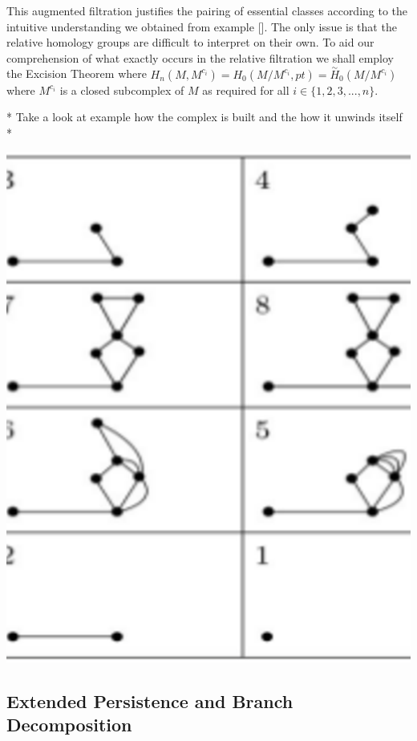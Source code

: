 
This augmented filtration justifies the pairing of essential classes according to the intuitive understanding we obtained from example []. The only issue is that the relative homology groups are difficult to interpret on their own. To aid our comprehension of what exactly occurs in the relative filtration we shall employ the Excision Theorem where $H_n(M, M^{c_i}) = H_0(M / M^{c_i}, pt) = \overset{\sim}{H}_0(M / M^{c_i})$ where $M^{c_i}$ is a closed subcomplex of $M$ as required for all $i \in \{1, 2, 3, ..., n\}$. 

* Take a look at example how the complex is built and the how it unwinds itself *

\includegraphics[scale=0.2,center]{./images/extended-ph.eps}

\subsection{Extended Persistence and Branch Decomposition}

